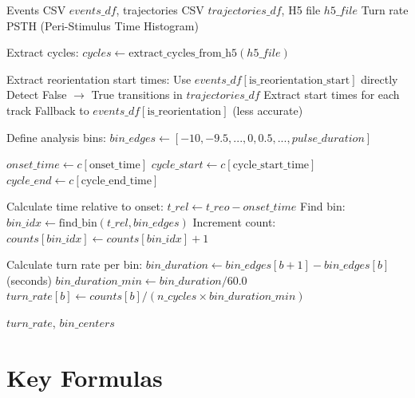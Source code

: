\documentclass[
  11pt,
]{article}
\begin{document}
\begin{algorithm}[H]
\caption{Calculate Stimulus-Locked Turn Rate}
\label{alg:stimulus-locked}
\begin{algorithmic}[1]
\REQUIRE Events CSV $events\_df$, trajectories CSV $trajectories\_df$, H5 file $h5\_file$
\ENSURE Turn rate PSTH (Peri-Stimulus Time Histogram)

\STATE Extract cycles: $cycles \leftarrow \text{extract\_cycles\_from\_h5}(h5\_file)$

\STATE Extract reorientation start times:
    \STATE Use $events\_df[\text{is\_reorientation\_start}]$ directly
    \STATE Detect False $\rightarrow$ True transitions in $trajectories\_df$
    \STATE Extract start times for each track
\ELSE
    \STATE Fallback to $events\_df[\text{is\_reorientation}]$ (less accurate)
\ENDIF

\STATE Define analysis bins: $bin\_edges \leftarrow [-10, -9.5, ..., 0, 0.5, ..., pulse\_duration]$

    \STATE $onset\_time \leftarrow c[\text{onset\_time}]$
    \STATE $cycle\_start \leftarrow c[\text{cycle\_start\_time}]$
    \STATE $cycle\_end \leftarrow c[\text{cycle\_end\_time}]$
    
        \STATE Calculate time relative to onset: $t\_rel \leftarrow t\_reo - onset\_time$
            \STATE Find bin: $bin\_idx \leftarrow \text{find\_bin}(t\_rel, bin\_edges)$
            \STATE Increment count: $counts[bin\_idx] \leftarrow counts[bin\_idx] + 1$
        \ENDIF
    \ENDFOR
\ENDFOR

\STATE Calculate turn rate per bin:
    \STATE $bin\_duration \leftarrow bin\_edges[b+1] - bin\_edges[b]$ (seconds)
    \STATE $bin\_duration\_min \leftarrow bin\_duration / 60.0$
    \STATE $turn\_rate[b] \leftarrow counts[b] / (n\_cycles \times bin\_duration\_min)$
\ENDFOR

\RETURN $turn\_rate$, $bin\_centers$
\end{algorithmic}
\end{algorithm}

\hypertarget{key-formulas}{%
\section{Key Formulas}\label{key-formulas}}
\end{document}
